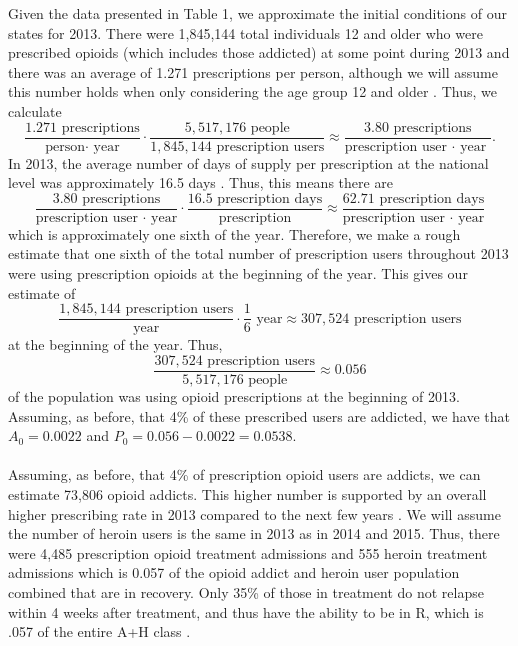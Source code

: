 \documentclass[12pt]{article}
\begin{document}
Given the data presented in Table 1, we approximate the initial conditions of our states for 2013. There were 1,845,144 total individuals 12 and older who were prescribed opioids (which includes those addicted) at some point during 2013 
and there was an average of 1.271 prescriptions per person, although we will assume this number holds when only considering the age group 12 and older \cite{CDC6}. 
Thus, we calculate 
$$\frac{1.271 \text{ prescriptions}}{\text{person$\cdot$ year}}\cdot \frac{5,517,176 \text{ people}}{1,845,144 \text{ prescription users}} \approx \frac{ 3.80 \text{ prescriptions}}{\text{prescription user $\cdot$ year }}.$$  
In 2013, the average number of days of supply per prescription at the national level was approximately 16.5 days \cite{CDC7}.
Thus, this means there are 
$$\frac{3.80 \text{ prescriptions}}{\text{prescription user $\cdot$ year}} \cdot \frac{{16.5 \text{ prescription days}}}{\text{prescription}} \approx \frac{62.71 \text{ prescription days}}{\text{prescription user $\cdot$ year}} $$
which is approximately one sixth of the year. Therefore, we make a rough estimate that one sixth of the total number of prescription users throughout 2013 were using prescription opioids at the beginning of the year. %
 This gives our estimate of 
$$\frac{1,845,144 \text{ prescription users}}{\text{year}} \cdot \frac{1}{6} \text{ year} \approx 307,524 \text{ prescription users}$$
at the beginning of the year. Thus, 
$$\frac{307,524 \text{ prescription users}}{5,517,176 \text{ people}} \approx 0.056 $$
of the population was using opioid prescriptions at the beginning of 2013. 
Assuming, as before, that 4\% of these prescribed users are addicted, we have that $A_0=0.0022$ and $P_0=0.056-0.0022=0.0538.$ %
\\ \\
Assuming, as before, that 4\% of prescription opioid users are addicts, we can estimate 73,806 opioid addicts. This higher number is supported by an overall higher prescribing rate in 2013 compared to the next few years \cite{CDC7}.
We will assume the number of heroin users is the same in 2013 as in 2014 and 2015. Thus, there were 4,485 prescription opioid treatment admissions and 555 heroin treatment admissions which is 0.057 of the opioid addict and heroin user population combined that are in recovery. Only 35\% of those in treatment do not relapse within 4 weeks after treatment, and thus have the ability to be in R, which is .057 of the entire A+H class \cite{Bailey}.
\end{document}
